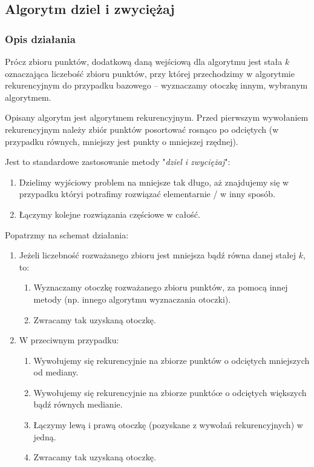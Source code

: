 \documentclass[11pt]{article}
\theoremstyle{remark} \newtheorem{definition}{def.}
\theoremstyle{definition} \newtheorem{twierdzenie}{tw.}
\begin{document}
\subsection{Algorytm dziel i zwyciężaj}
    \subsubsection{Opis działania}
    Prócz zbioru punktów, dodatkową daną wejściową dla algorytmu jest stała $k$ oznaczająca liczebość zbioru punktów, przy której przechodzimy w algorytmie 
    rekurencyjnym do przypadku bazowego -- wyznaczamy otoczkę innym, wybranym algorytmem.
    
    Opisany algorytm jest algorytmem rekurencyjnym. Przed pierwszym wywołaniem rekurencyjnym należy zbiór punktów posortować 
    rosnąco po odciętych (w przypadku równych, mniejszy jest punkty o mniejszej rzędnej). 
   
    Jest to standardowe zastosowanie metody "\emph{dziel i zwyciężaj}": 
    \begin{enumerate}
        \item   Dzielimy wyjściowy problem na mniejsze tak długo, aż znajdujemy się w przypadku któryi potrafimy rozwiązać elementarnie / w inny sposób.
        \item   Łączymy kolejne rozwiązania częściowe w całość. 
    \end{enumerate}


    Popatrzmy na schemat działania:

    \begin{enumerate}
        \item   Jeżeli liczebność rozważanego zbioru jest mniejsza bądź równa danej stałej $k$, to:
                \begin{enumerate}
                    \item   Wyznaczamy otoczkę rozważanego zbioru punktów, za pomocą innej metody (np. innego algorytmu wyznaczania otoczki).
                    \item   Zwracamy tak uzyskaną otoczkę.
                \end{enumerate}
        \item   W przeciwnym przypadku:
                \begin{enumerate}
                    \item   Wywołujemy się rekurencyjnie na zbiorze punktów o odciętych mniejszych od mediany.
                    \item   Wywołujemy się rekurencyjnie na zbiorze punktóœ o odciętych większych bądź równych medianie.
                    \item   Łączymy lewą i prawą otoczkę (pozyskane z wywołań rekurencyjnych) w jedną. 
                    \item   Zwracamy tak uzyskaną otoczkę.
                \end{enumerate}
    \end{enumerate}
\end{document}
